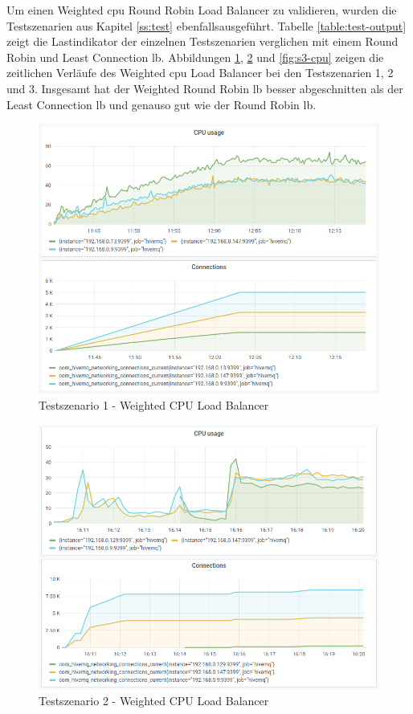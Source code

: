 Um einen Weighted \ac{cpu} Round Robin Load Balancer zu validieren, wurden die Testszenarien aus Kapitel \ref{ss:test} ebenfallsausgeführt. Tabelle \ref{table:test-output} zeigt die Lastindikator der einzelnen Testszenarien verglichen mit einem Round Robin und Least Connection \ac{lb}. Abbildungen \ref{fig:s1-cpu}, \ref{fig:s2-cpu} und \ref{fig:s3-cpu} zeigen die zeitlichen Verläufe des Weighted \ac{cpu} Load Balancer bei den Testszenarien 1, 2 und 3.
Insgesamt hat der Weighted Round Robin \ac{lb} besser abgeschnitten als der Least Connection \ac{lb} und genauso gut wie der Round Robin \ac{lb}.
\begin{figure}
    \centering
    \includegraphics[scale=0.8]{images/s1_cpu.png}
    \caption{Testszenario 1 - Weighted CPU Load Balancer}
    \label{fig:s1-cpu}
\end{figure}
\begin{figure}
    \centering
    \includegraphics[scale=0.8]{images/s2_cpu.png}
    \caption{Testszenario 2 - Weighted CPU Load Balancer}
    \label{fig:s2-cpu}
\end{figure}
